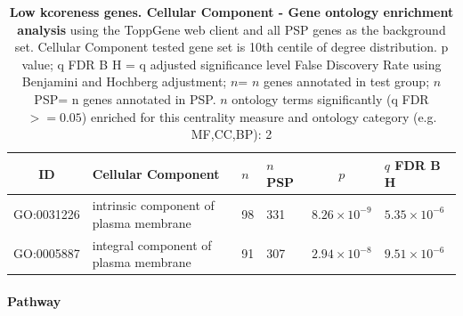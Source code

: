  \begin{table}[ht]
\centering
\begin{adjustbox}{width=\textwidth}
\setlength{\extrarowheight}{2pt}
\begin{tabular}{@{}clllcl@{}}
  \toprule
  ID & Cellular Component & $n$ & $n$ PSP & $p$ & $q$ FDR B H \\ 

  \midrule
GO:0031226 & intrinsic component of plasma membrane & 98 & 331 & $8.26 \times 10^{-9}$ & $5.35 \times 10^{-6}$ \\ 
  GO:0005887 & integral component of plasma membrane & 91 & 307 & $2.94 \times 10^{-8}$ & $9.51 \times 10^{-6}$ \\ 
   \hline
\end{tabular}
\end{adjustbox}
\caption[Gene ontology enrichment Low kcoreness genes Cellular Component of genes above 90th centile of distribution]{\textbf{Low kcoreness genes. Cellular Component - Gene ontology enrichment analysis} using the ToppGene web client and all PSP genes as the background set.  Cellular Component tested gene set is 10th centile of degree distribution.  p value; q FDR B H = q adjusted significance level False Discovery Rate using Benjamini and Hochberg adjustment; $n$= $n$ genes annotated in test group; $n$ PSP= n genes annotated in PSP. $n$ ontology terms significantly (q FDR$>=0.05$) enriched for this centrality measure and ontology category (e.g. MF,CC,BP): 2} 
\label{tab:ToppGENE GO: Cellular Component. kco 10 centile cwpsp.txtp = p value; q FDR B H = q adjusted significance level False Discovery Rate using Benjamini and Hochberg adjustment; n= n genes annotated in test group; n PSP= n genes annotated in PSP. n significant in category 2}
\end{table}

\paragraph{Pathway}

